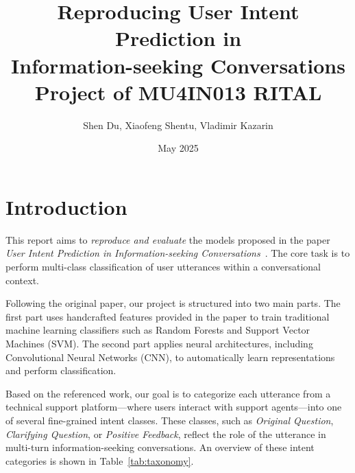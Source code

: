 \documentclass{article}
\title{Reproducing User Intent Prediction in\\Information-seeking Conversations\\\large Project of MU4IN013 RITAL}
\author{Shen Du, Xiaofeng Shentu, Vladimir Kazarin}
\date{May 2025}
\begin{document}
\maketitle

\section{Introduction}

This report aims to \textit{reproduce and evaluate} the models proposed in the paper \textit{User Intent Prediction in Information-seeking Conversations}~\cite{qu2019user}. The core task is to perform multi-class classification of user utterances within a conversational context.

Following the original paper, our project is structured into two main parts. The first part uses handcrafted features provided in the paper to train traditional machine learning classifiers such as Random Forests and Support Vector Machines (SVM). The second part applies neural architectures, including Convolutional Neural Networks (CNN), to automatically learn representations and perform classification.

Based on the referenced work, our goal is to categorize each utterance from a technical support platform—where users interact with support agents—into one of several fine-grained intent classes. These classes, such as \textit{Original Question}, \textit{Clarifying Question}, or \textit{Positive Feedback}, reflect the role of the utterance in multi-turn information-seeking conversations. An overview of these intent categories is shown in Table~\ref{tab:taxonomy}.
\end{document}
